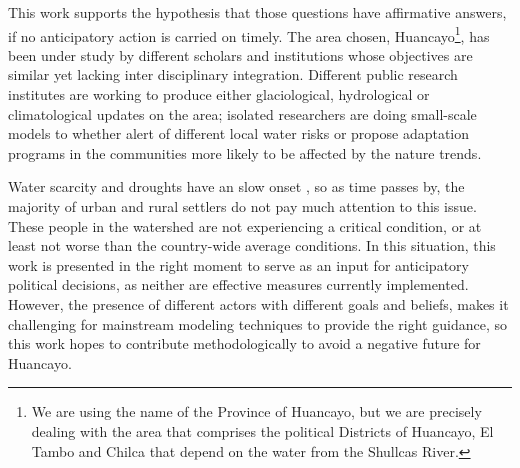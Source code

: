 \documentclass[doc,12pt,floatsintext]{apa7}
\begin{document}
This work supports the hypothesis that those questions have affirmative answers, if no anticipatory action is carried on timely. The area chosen, Huancayo\footnote{We are using the name of the Province of Huancayo, but we are precisely dealing with the area that comprises the political Districts of Huancayo, El Tambo and Chilca that depend on the water from the Shullcas River.}, has been under study by different scholars and institutions whose objectives are similar yet lacking inter disciplinary integration. Different public  research institutes are working to produce either glaciological, hydrological or climatological updates on the area; isolated researchers are doing small-scale models to whether alert of different local water risks or propose adaptation programs in the communities more likely to be affected by the nature trends.

Water scarcity and droughts have an slow onset \parencite{singh_losses_2021}, so as time passes by, the majority of urban and rural settlers do not pay much attention to this issue. These people in the watershed are not experiencing a critical condition, or at least not worse than the country-wide average conditions. In this situation, this work is presented in the right moment to serve as an input for  anticipatory political decisions, as neither are effective measures currently implemented. However, the presence of different actors with different goals and beliefs, makes it challenging for mainstream modeling techniques to provide the right guidance, so this work hopes to contribute methodologically to avoid a negative future for Huancayo.
\end{document}
